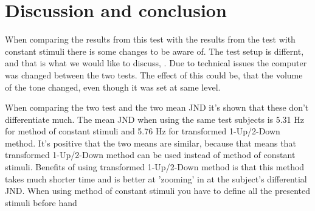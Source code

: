 \section*{Discussion and conclusion}
When comparing the results from this test with the results from the test with constant stimuli there is some changes to be aware of. The test setup is differnt, and that is what we would like to discuss, . Due to technical issues the computer was changed between the two tests. The effect of this could be, that the volume of the tone changed, even though it was set at same level. 

When comparing the two test and the two mean JND it's shown that these don't differentiate much. The mean JND when using the same test subjects is 5.31 Hz for method of constant stimuli and 5.76 Hz for transformed 1-Up/2-Down method. It's positive that the two means are similar, because that means that transformed 1-Up/2-Down method can be used instead of method of constant stimuli. Benefits of using transformed 1-Up/2-Down method is that this method takes much shorter time and is better at 'zooming' in at the subject's differential JND. When using method of constant stimuli you have to define all the presented stimuli before hand








